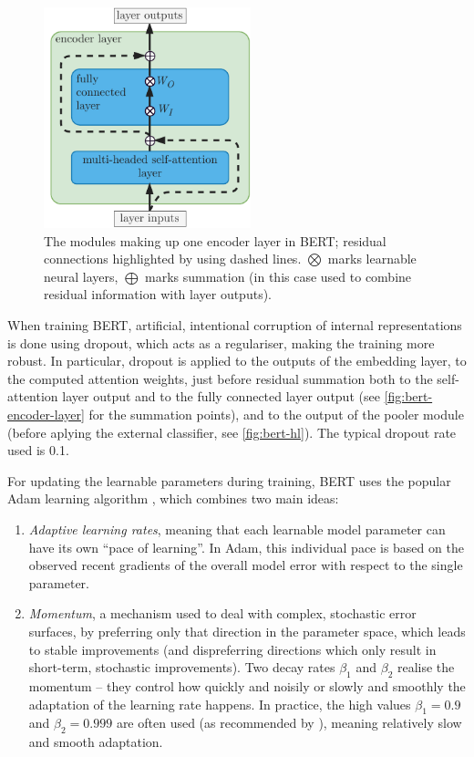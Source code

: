 \documentclass[bsc,frontabs,singlespacing,parskip,deptreport]{infthesis}
\begin{document}
{{{      \begin{figure}[h!t]
        \centering
        \includegraphics[width=6cm]{graphics/bert-encoder-layer}
        \caption{The modules making up one encoder layer in BERT; residual connections highlighted by using dashed lines. $\bigotimes$ marks learnable neural layers, $\bigoplus$ marks summation (in this case used to combine residual information with layer outputs).}
        \label{fig:bert-encoder-layer}
      \end{figure}

      When training BERT, artificial, intentional corruption of internal representations is done using dropout, which acts as a regulariser, making the training more robust. In particular, dropout is applied to the outputs of the embedding layer, to the computed attention weights, just before residual summation both to the self-attention layer output and to the fully connected layer output (see \autoref{fig:bert-encoder-layer} for the summation points), and to the output of the pooler module (before aplying the external classifier, see \autoref{fig:bert-hl}). The typical dropout rate used is 0.1.
      
      For updating the learnable parameters during training, BERT uses the popular Adam learning algorithm \citep{Kingma_2014}, which combines two main ideas:
      \begin{enumerate}
        \item \textit{Adaptive learning rates}, meaning that each learnable model parameter can have its own ``pace of learning''. In Adam, this individual pace is based on the observed recent gradients of the overall model error with respect to the single parameter.
        \item \textit{Momentum}, a mechanism used to deal with complex, stochastic error surfaces, by preferring only that direction in the parameter space, which leads to stable improvements (and dispreferring directions which only result in short-term, stochastic improvements). Two decay rates $\beta_1$ and $\beta_2$ realise the momentum -- they control how quickly and noisily or slowly and smoothly the adaptation of the learning rate happens. In practice, the high values $\beta_1=0.9$ and $\beta_2=0.999$ are often used (as recommended by \citeauthor{Kingma_2014}), meaning relatively slow and smooth adaptation.
      \end{enumerate}
      
}}}
\end{document}
